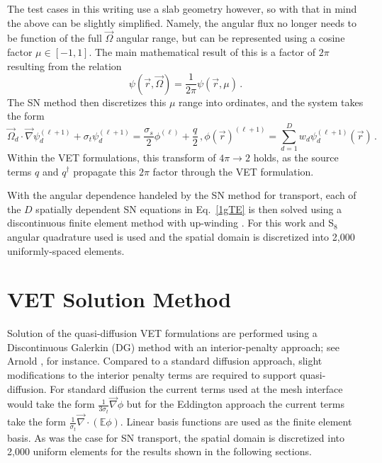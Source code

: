 \documentclass[12pt]{report}
\newcommand{\vr}{\vec{r}}
\newcommand{\vO}{\vec{\Omega}}
\renewcommand{\div}{\vec{\nabla} \cdot}
\newcommand{\grad}{\vec{\nabla}}
\newcommand{\Edd}{\mathbb{E}}
\newcommand{\sigt}{\sigma_t}
\newcommand{\sigs}{\sigma_s}
\begin{document}
The test cases in this writing use a slab geometry however, so with that in mind the above can be slightly simplified. Namely, the angular flux no longer needs to be function of the full $\vO$ angular range, but can be represented using a cosine factor $\mu \in [-1,1]$. The main mathematical result of this is a factor of $2 \pi$ resulting from the relation 
\begin{equation}
\psi(\vr,\vO)=\frac{1}{2 \pi} \psi(\vr,\mu) \, .
\end{equation} 
The SN method then discretizes this $\mu$ range into ordinates, and the system takes the form
\begin{subequations}
\begin{equation}
\label{1gTEmu}
\vO_d \cdot \grad \psi_d^{(\ell+1)} + \sigt \psi_d^{(\ell+1)} = \frac{\sigs}{2} \phi^{(\ell)} + \frac{q}{2}\,,
\end{equation}
\begin{equation}
\phi(\vr)^{(\ell+1)} = \sum_{d=1}^D w_d \psi_d^{(\ell+1)}(\vr) \,.
\end{equation}
\end{subequations}
Within the VET formulations, this transform of $4 \pi \to 2$ holds, as the source terms $q$ and $q^\dag$ propagate this $2 \pi$ factor through the VET formulation.

With the angular dependence handeled by the SN method for transport, each of the $D$ spatially dependent SN equations in Eq.~\eqref{1gTE} is then solved using a discontinuous finite element method with up-winding \cite{ReedHill}. For this work and S$_8$ angular quadrature used is used and the spatial domain is discretized into 2,000 uniformly-spaced elements.



\section{VET Solution Method}
Solution of the quasi-diffusion VET formulations are performed using a Discontinuous Galerkin (DG) method with an interior-penalty approach; see Arnold \cite{Arnold}, for instance. Compared to a standard diffusion approach, slight modifications to the interior penalty terms are required to support quasi-diffusion. For standard diffusion the current terms used at the mesh interface would take the form $\frac{1}{3 \sigt} \grad \phi$ but for the Eddington approach the current terms take the form $\frac{1}{\sigt} \div ( \Edd \phi)$. Linear basis functions are used as the finite element basis. As was the case for SN transport, the spatial domain is discretized into 2,000 uniform elements for the results shown in the following sections.
\end{document}
